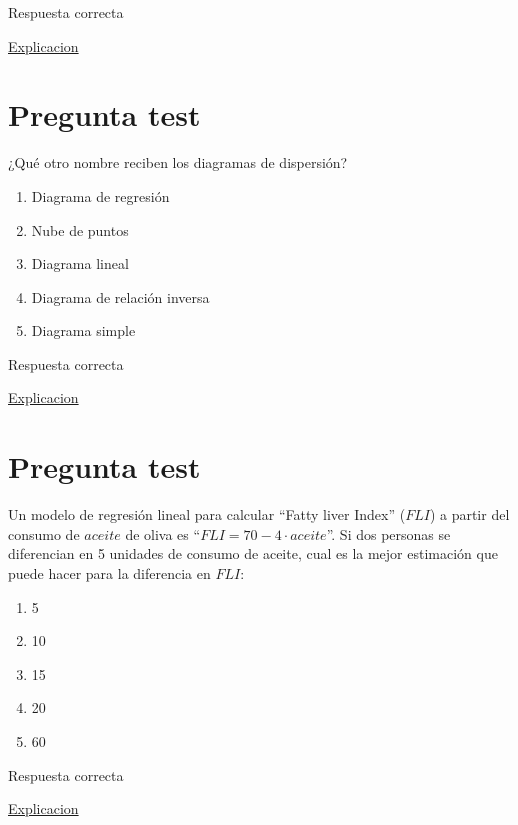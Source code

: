 \documentclass[
]{book}
\providecommand{\tightlist}{%
  \setlength{\itemsep}{0pt}\setlength{\parskip}{0pt}}
\begin{document}
Respuesta correcta

\href{https://1fjmanzano.github.io/bioestadistica/relaci\%C3\%B3n-entre-variables-nume\%CC\%81ricas.html\#coeficiente-de-correlacio\%CC\%81n}{Explicacion}

\hypertarget{pregunta-test-144}{%
\section{Pregunta test}\label{pregunta-test-144}}

¿Qué otro nombre reciben los diagramas de dispersión?

\begin{enumerate}
\def\labelenumi{\alph{enumi})}
\tightlist
\item
  Diagrama de regresión
\item
  Nube de puntos
\item
  Diagrama lineal
\item
  Diagrama de relación inversa
\item
  Diagrama simple
\end{enumerate}

Respuesta correcta

\href{https://1fjmanzano.github.io/bioestadistica/relaci\%C3\%B3n-entre-variables-nume\%CC\%81ricas.html\#diagramas-de-dispersio\%CC\%81n}{Explicacion}

\hypertarget{pregunta-test-145}{%
\section{Pregunta test}\label{pregunta-test-145}}

Un modelo de regresión lineal para calcular ``Fatty liver Index'' (\(FLI\)) a partir del consumo de \(aceite\) de oliva es ``\(FLI=70- 4 \cdot aceite\)''. Si dos personas se diferencian en 5 unidades de consumo de aceite, cual es la mejor estimación que puede hacer para la diferencia en \(FLI\):

\begin{enumerate}
\def\labelenumi{\alph{enumi})}
\tightlist
\item
  5
\item
  10
\item
  15
\item
  20
\item
  60
\end{enumerate}

Respuesta correcta

\href{https://1fjmanzano.github.io/bioestadistica/relaci\%C3\%B3n-entre-variables-nume\%CC\%81ricas.html\#regresio\%CC\%81n-lineal}{Explicacion}
\end{document}

